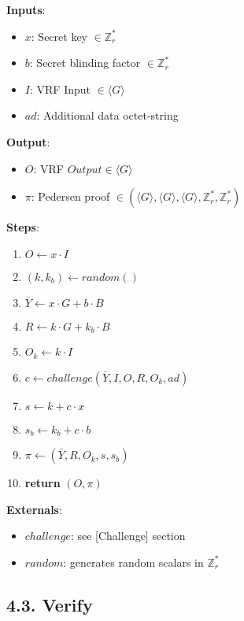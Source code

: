 \documentclass[
]{article}
\providecommand{\tightlist}{%
  \setlength{\itemsep}{0pt}\setlength{\parskip}{0pt}}
\begin{document}
\textbf{Inputs}:

\begin{itemize}
\tightlist
\item
  \(x\): Secret key \(\in \mathbb{Z}^*_r\)
\item
  \(b\): Secret blinding factor \(\in \mathbb{Z}^*_r\)
\item
  \(I\): VRF Input \(\in \langle G \rangle\)
\item
  \(ad\): Additional data octet-string
\end{itemize}

\textbf{Output}:

\begin{itemize}
\tightlist
\item
  \(O\): VRF \(Output \in \langle G \rangle\)
\item
  \(\pi\): Pedersen proof
  \(\in (\langle G \rangle, \langle G \rangle, \langle G \rangle, \mathbb{Z}^*_r, \mathbb{Z}^*_r)\)
\end{itemize}

\textbf{Steps}:

\begin{enumerate}
\def\labelenumi{\arabic{enumi}.}
\tightlist
\item
  \(O \leftarrow x \cdot I\)
\item
  \((k, k_b) \leftarrow random()\)
\item
  \(\bar{Y} \leftarrow x \cdot G + b \cdot B\)
\item
  \(R \leftarrow k \cdot G + k_b \cdot B\)
\item
  \(O_k \leftarrow k \cdot I\)
\item
  \(c \leftarrow challenge(\bar{Y}, I, O, R, O_k, ad)\)
\item
  \(s \leftarrow k + c \cdot x\)
\item
  \(s_b \leftarrow k_b + c \cdot b\)
\item
  \(\pi \leftarrow (\bar{Y}, R, O_k, s, s_b)\)
\item
  \textbf{return} \((O, \pi)\)
\end{enumerate}

\textbf{Externals}:

\begin{itemize}
\tightlist
\item
  \(challenge\): see {[}Challenge{]} section
\item
  \(random\): generates random scalars in \(\mathbb{Z}^*_r\)
\end{itemize}

\hypertarget{verify-1}{%
\subsection{4.3. Verify}\label{verify-1}}
\end{document}
